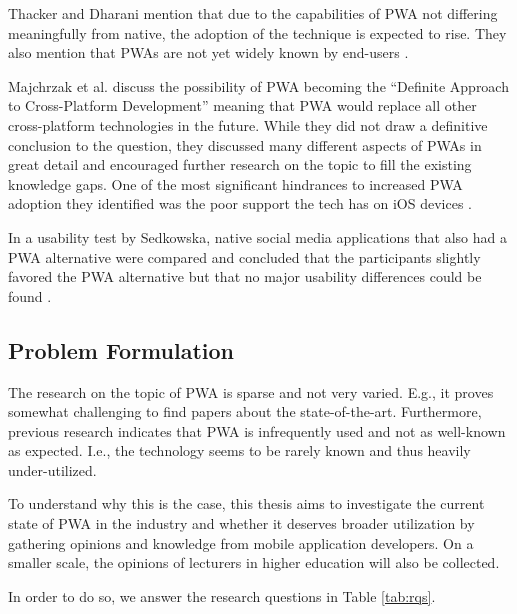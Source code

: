 \documentclass[a4paper,12pt]{article}
\begin{document}
Thacker and Dharani mention that due to the capabilities of PWA not differing meaningfully from native, the adoption of the technique is expected to rise. They also mention that PWAs are not yet widely known by end-users \cite{realize_native_with_pwa}.

Majchrzak et al. discuss the possibility of PWA becoming the “Definite Approach to Cross-Platform Development” meaning that PWA would replace all other cross-platform technologies in the future. While they did not draw a definitive conclusion to the question, they discussed many different aspects of PWAs in great detail and encouraged further research on the topic to fill the existing knowledge gaps. One of the most significant hindrances to increased PWA adoption they identified was the poor support the tech has on iOS devices \cite{pwa_definite_approach}.

In a usability test by Sedkowska, native social media applications that also had a PWA alternative were compared and concluded that the participants slightly favored the PWA alternative but that no major usability differences could be found \cite{thesis_pwa_ux}.

\subsection{Problem Formulation}
\label{Intro_problem}
The research on the topic of PWA is sparse and not very varied. E.g., it proves somewhat challenging to find papers about the state-of-the-art. Furthermore, previous research indicates that PWA is infrequently used and not as well-known as expected. I.e., the technology seems to be rarely known and thus heavily under-utilized.

To understand why this is the case, this thesis aims to investigate the current state of PWA in the industry and whether it deserves broader utilization by gathering opinions and knowledge from mobile application developers. On a smaller scale, the opinions of lecturers in higher education will also be collected.

In order to do so, we answer the research questions in Table \ref{tab:rqs}.
\end{document}
